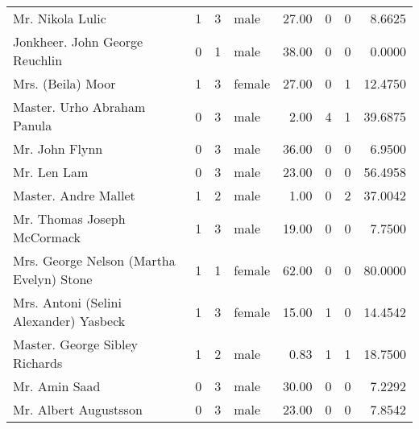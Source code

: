 \begin{tabular}{lrrlrrrr}
Mr. Nikola Lulic                                   &         1 &       3 &    male &  27.00 &                        0 &                        0 &    8.6625 \\
Jonkheer. John George Reuchlin                     &         0 &       1 &    male &  38.00 &                        0 &                        0 &    0.0000 \\
Mrs. (Beila) Moor                                  &         1 &       3 &  female &  27.00 &                        0 &                        1 &   12.4750 \\
Master. Urho Abraham Panula                        &         0 &       3 &    male &   2.00 &                        4 &                        1 &   39.6875 \\
Mr. John Flynn                                     &         0 &       3 &    male &  36.00 &                        0 &                        0 &    6.9500 \\
Mr. Len Lam                                        &         0 &       3 &    male &  23.00 &                        0 &                        0 &   56.4958 \\
Master. Andre Mallet                               &         1 &       2 &    male &   1.00 &                        0 &                        2 &   37.0042 \\
Mr. Thomas Joseph McCormack                        &         1 &       3 &    male &  19.00 &                        0 &                        0 &    7.7500 \\
Mrs. George Nelson (Martha Evelyn) Stone           &         1 &       1 &  female &  62.00 &                        0 &                        0 &   80.0000 \\
Mrs. Antoni (Selini Alexander) Yasbeck             &         1 &       3 &  female &  15.00 &                        1 &                        0 &   14.4542 \\
Master. George Sibley Richards                     &         1 &       2 &    male &   0.83 &                        1 &                        1 &   18.7500 \\
Mr. Amin Saad                                      &         0 &       3 &    male &  30.00 &                        0 &                        0 &    7.2292 \\
Mr. Albert Augustsson                              &         0 &       3 &    male &  23.00 &                        0 &                        0 &    7.8542 \\

\end{tabular}
